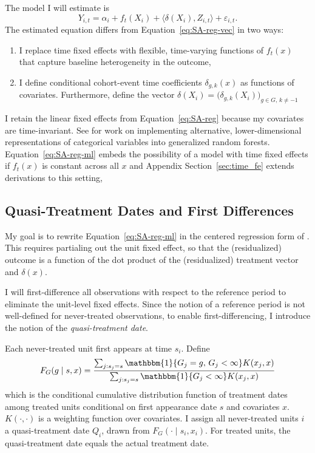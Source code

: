 \documentclass[12pt,notitlepage]{article}
\renewcommand{\eqref}[1]{Equation~\ref{#1}}
\begin{document}
The model I will estimate is 
\begin{equation}\label{eq:SA-reg-ml}
Y_{i,t} = \alpha_i + f_t(X_i) 
+ \langle \delta(X_i), Z_{i,t} \rangle + \varepsilon_{i,t}. 
\end{equation}
The estimated equation differs from \eqref{eq:SA-reg-vec} in two ways: 
\begin{enumerate}
    \item I replace time fixed effects with flexible, time-varying functions of $f_t(x)$ that capture baseline heterogeneity in the outcome,
    \item I define conditional cohort-event time coefficients $\delta_{g,k}(x)$ as functions of covariates.
Furthermore, define the vector $\delta(X_i) = \big(\delta_{g,k}(X_i)\big)_{g \in G, \, k \neq -1}$
\end{enumerate}

I retain the linear fixed effects from \eqref{eq:SA-reg} because my covariates are time-invariant.
See \citealt{johannemann_sufficient_2021} for work on implementing alternative, lower-dimensional representations of categorical variables into generalized random forests. 
\eqref{eq:SA-reg-ml} embeds the possibility of a model with time fixed effects if $f_t(x)$ is constant across all $x$ and Appendix Section~\ref{sec:time_fe} extends derivations to this setting, 

\subsection{Quasi-Treatment Dates and First Differences}
My goal is to rewrite \eqref{eq:SA-reg-ml} in the centered regression form of \cite{robinson_root-n-consistent_1988}.
This requires partialing out the unit fixed effect, so that the (residualized) outcome is a function of the dot product of the (residualized) treatment vector and $\delta(x)$. 

I will first-difference all observations with respect to the reference period to eliminate the unit-level fixed effects. 
Since the notion of a reference period is not well-defined for never-treated observations, to enable first-differencing, I introduce the notion of the \emph{quasi-treatment date}.

Each never-treated unit first appears at time $s_i$. 
Define 
\begin{equation}\label{eq:FGx}
    F_G(g \mid s, x) = 
    \frac{\sum_{j: s_j = s} \mathbbm{1}\{G_j = g,\, G_j < \infty\} K(x_j, x)}
         {\sum_{j: s_j = s} \mathbbm{1}\{G_j < \infty\} K(x_j, x)}
\end{equation}
which is the conditional cumulative distribution function of treatment dates among treated units conditional on first appearance date $s$ and covariates $x$.
$K(\cdot, \cdot)$ is a weighting function over covariates. 
I assign all never-treated units $i$ a quasi-treatment date $Q_i$, drawn from  $F_G(\cdot \mid s_i, x_i)$. 
For treated units, the quasi-treatment date equals the actual treatment date.
\end{document}
